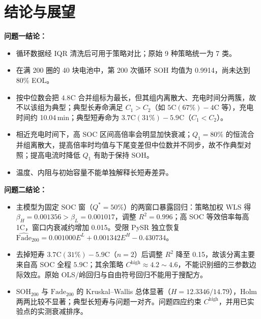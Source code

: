 \documentclass[a4paper,12pt,UTF8,zihao=-4]{ctexart}
\begin{document}





\section{结论与展望}

\begin{resultbox}
\textbf{问题一结论：}
\begin{itemize}
  \item 循环数据经 IQR 清洗后可用于策略对比；原始 9 种策略统一为 7 类。
  \item 在满 200 圈的 40 块电池中，第 200 次循环 SOH 均值为 0.9914，尚未达到 80\% EOL。
  \item 按中位数会把 \(4.8\mathrm{C}\) 合并组标为最长，但其组内离散大、充电时间分两簇，故不以该组为典型；典型长寿命满足 \(C_1>C_2\)（如 \(5\mathrm{C}(67\%)-4\mathrm{C}\) 等），充电时间约 10.04\,min；典型短寿命为 \(3.7\mathrm{C}(31\%)-5.9\mathrm{C}\)（\(C_1<C_2\)）。
  \item 相近充电时间下，高 SOC 区间高倍率会明显加快衰减；\(Q_1=80\%\) 的恒流合并组离散大，提高倍率时均值与下尾变差但中位数并不同步，故不作典型对照；提高电流时降低 \(Q_1\) 有助于保持 SOH。
  \item 温度、内阻与初始容量不能单独解释长短寿差异。
\end{itemize}
\end{resultbox}

\begin{resultbox}
\textbf{问题二结论：}
\begin{itemize}
  \item 主模型为固定 SOC 窗（\(Q^\ast=50\%\)）的两窗口暴露回归：策略加权 WLS 得 \(\beta_H=0.001356>\beta_L=0.001017\)，调整 \(R^2=0.996\)；高 SOC 等效倍率每高 1C，窗口内衰减约增加 0.015。受限 PySR 独立恢复 \(\widehat{\mathrm{Fade}}_{200}=0.001000 E^{L}+0.001342 E^{H}-0.430734\)。
  \item 去掉短寿 \(3.7\mathrm{C}(31\%)-5.9\mathrm{C}\)（\(n=2\)）后调整 \(R^2\) 降至 0.15，故该分离主要来自高 SOC 全程 \(5.9\mathrm{C}\)；其余策略 \(C^{\mathrm{high}}\approx 4.2\sim 4.6\)，不能识别细的三参数边际效应。原始 OLS/岭回归与自由符号回归不能用于搜配方。
  \item \(\mathrm{SOH}_{200}\) 与 \(\mathrm{Fade}_{200}\) 的 Kruskal--Wallis 总体显著（\(H=12.3346/14.79\)），Holm 两两比较不显著；典型长短寿与问题一对齐。问题四应约束 \(C^{\mathrm{high}}\)，并用已实验点的实测衰减排序。
\end{itemize}
\end{resultbox}
\end{document}
